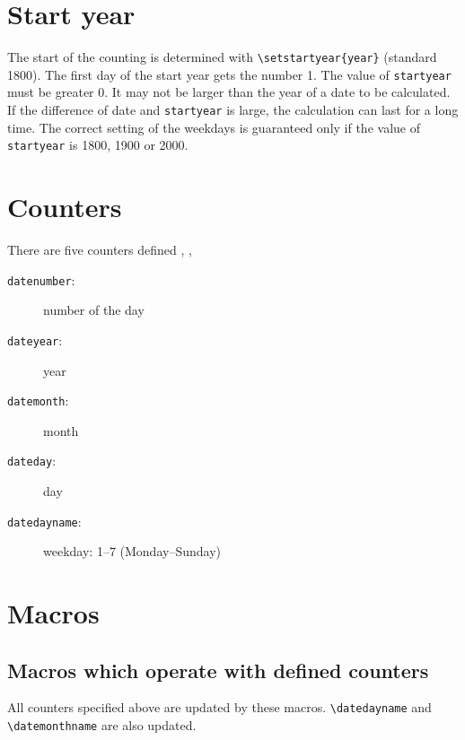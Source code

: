 \section{Start year}

The start of the counting is determined with \verb+\setstartyear{year}+ (standard 1800). The first day of the start year gets the number 1. The value of \texttt{startyear} must be greater 0. It may not be larger than the year of a date to be calculated. If the difference of date and \texttt{startyear} is large, the calculation can last for a long time. The correct setting of the weekdays is guaranteed only if the value of \texttt{startyear} is 1800, 1900 or 2000.


\section{Counters}
There are five counters defined , , 

\begin{description}
\item[\texttt{datenumber}:] number of the day
\item[\texttt{dateyear}:] year
\item[\texttt{datemonth}:] month
\item[\texttt{dateday}:] day
\item[\texttt{datedayname}:] weekday: 1--7 (Monday--Sunday)
\end{description}


\section{Macros}
\subsection{Macros which operate with defined counters\label{macro}}
All counters specified above are updated by these macros. \verb+\datedayname+ and \verb+\datemonthname+ are also updated.

